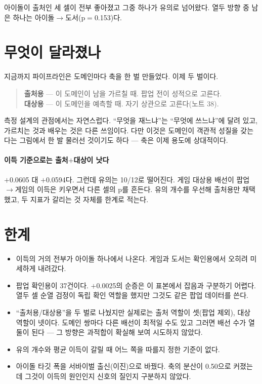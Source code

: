 \documentclass[10pt]{article}
\begin{document}
아이돌이 출처인 세 셀이 전부 좋아졌고 그중 하나가 유의로 넘어왔다. 열두 방향 중
남은 하나는 아이돌$\to$도서(p$=$0.153)다.


\section{무엇이 달라졌나}

지금까지 파이프라인은 도메인마다 축을 한 벌 만들었다. 이제 두 벌이다.

\begin{quote}\fontsize{9.5}{11.5}\selectfont
\textbf{출처용} --- 이 도메인이 남을 가르칠 때. 팝업 전이 성적으로 고른다.\\[0.25em]
\textbf{대상용} --- 이 도메인을 예측할 때. 자기 상관으로 고른다(노트 38).
\end{quote}

측정 설계의 관점에서는 자연스럽다. ``무엇을 재느냐''는 ``무엇에 쓰느냐''에
달려 있고, 가르치는 것과 배우는 것은 다른 쓰임이다. 다만 이것은 도메인이
객관적 성질을 갖는다는 그림에서 한 발 물러선 것이기도 하다 --- 축은 이제
용도에 상대적이다.

\paragraph{이득 기준으로는 출처$+$대상이 낫다}
$+$0.0605 대 $+$0.0594다. 그런데 유의는 10/12로 떨어진다. 게임 대상용 배선이
팝업$\to$게임의 이득은 키우면서 다른 셀의 p를 흔든다. 유의 개수를 우선해
출처용만 채택했고, 두 지표가 갈리는 것 자체를 한계로 적는다.

\section{한계}

\begin{itemize}[leftmargin=1.1em,itemsep=0.15em]
\item 이득의 거의 전부가 아이돌 하나에서 나온다. 게임과 도서는 확인용에서
      오히려 미세하게 내려갔다.
\item 팝업 확인용이 37건이다. $+$0.0025의 순증은 이 표본에서 잡음과 구분하기
      어렵다. 열두 셀 순열 검정이 독립 확인 역할을 했지만 그것도 같은 팝업
      데이터를 쓴다.
\item ``출처용/대상용''을 두 벌로 나눴지만 실제로는 출처 역할이 셋(팝업 제외),
      대상 역할이 넷이다. 도메인 쌍마다 다른 배선이 최적일 수도 있고 그러면
      배선 수가 열둘이 된다 --- 그 방향은 과적합이 확실해 보여 시도하지 않았다.
\item 유의 개수와 평균 이득이 갈릴 때 어느 쪽을 따를지 정한 기준이 없다.
\item 아이돌 타깃 폭을 서바이벌 출신(이진)으로 바꿨다. 축의 분산이 0.50으로
      커졌는데 그것이 이득의 원인인지 신호의 질인지 구분하지 않았다.
\end{itemize}
\end{document}
